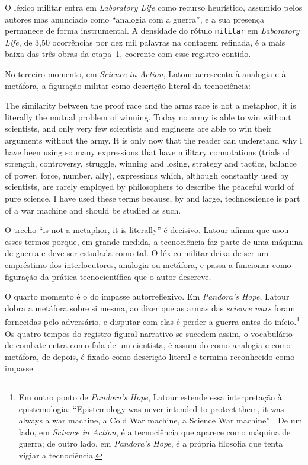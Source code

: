 O léxico militar entra em \emph{Laboratory Life} como recurso heurístico, assumido pelos autores mas anunciado como \enquote{analogia com a guerra}, e a sua presença permanece de forma instrumental. A densidade do rótulo \texttt{militar} em \emph{Laboratory Life}, de 3,50 ocorrências por dez mil palavras na contagem refinada, é a mais baixa das três obras da etapa~1, coerente com esse registro contido.

No terceiro momento, em \emph{Science in Action}, Latour acrescenta à analogia e à metáfora, a figuração militar como descrição literal da tecnociência:

\begin{citacaoabnt}
The similarity between the proof race and the arms race is not a metaphor, it is literally the mutual problem of winning. Today no army is able to win without scientists, and only very few scientists and engineers are able to win their arguments without the army. It is only now that the reader can understand why I have been using so many expressions that have military connotations (trials of strength, controversy, struggle, winning and losing, strategy and tactics, balance of power, force, number, ally), expressions which, although constantly used by scientists, are rarely employed by philosophers to describe the peaceful world of pure science. I have used these terms because, by and large, technoscience is part of a war machine and should be studied as such. \parencite[p.~172]{Latour1987Science}
\end{citacaoabnt}

O trecho \enquote{is not a metaphor, it is literally} é decisivo. Latour afirma que usou esses termos porque, em grande medida, a tecnociência faz parte de uma máquina de guerra e deve ser estudada como tal. O léxico militar deixa de ser um empréstimo dos interlocutores, analogia ou metáfora, e passa a funcionar como figuração da prática tecnocientífica que o autor descreve.

O quarto momento é o do impasse autorreflexivo. Em \emph{Pandora's Hope}, Latour dobra a metáfora sobre si mesma, ao dizer que as armas das \textit{science wars} foram fornecidas pelo adversário, e disputar com elas é perder a guerra antes do início.\footnote{Em outro ponto de \emph{Pandora's Hope}, Latour estende essa interpretação à epistemologia: \enquote{Epistemology was never intended to protect them, it was always a war machine, a Cold War machine, a Science War machine} \parencite[p.~296]{Latour1999PandorasHope}. De um lado, em \emph{Science in Action}, é a tecnociência que aparece como máquina de guerra; de outro lado, em \emph{Pandora's Hope}, é a própria filosofia que tenta vigiar a tecnociência.} Os quatro tempos do registro figural-narrativo se sucedem assim, o vocabulário de combate entra como fala de um cientista, é assumido como analogia e como metáfora, de depois, é fixado como descrição literal e termina reconhecido como impasse.

